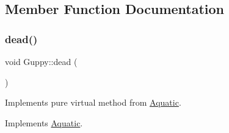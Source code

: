 \subsection{Member Function Documentation}
\mbox{\label{class_guppy_abcdcd74d4c3fdddfc5cc0439c0e512b7}} 
\subsubsection{\texorpdfstring{dead()}{dead()}}
{\footnotesize\ttfamily void Guppy\+::dead (\begin{DoxyParamCaption}{ }\end{DoxyParamCaption})\hspace{0.3cm}{\ttfamily [virtual]}}



Implements pure virtual method from \mbox{\hyperlink{class_aquatic}{Aquatic}}. 



Implements \mbox{\hyperlink{class_aquatic_a22fdb11e9cfec922fe50638709768276}{Aquatic}}.

